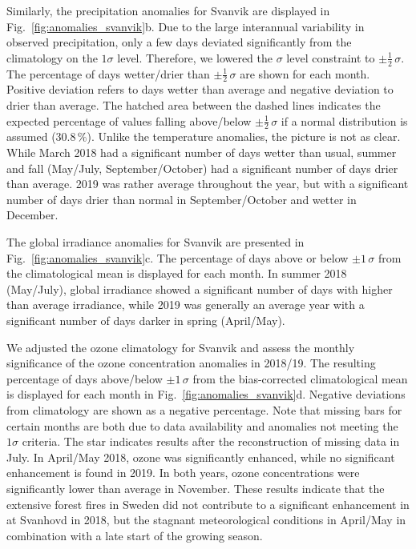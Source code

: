 \documentclass[bg, manuscript]{copernicus}
\begin{document}
Similarly, the precipitation anomalies for Svanvik are displayed in Fig.~\ref{fig:anomalies_svanvik}b. Due to the large interannual variability in observed precipitation, only a few days deviated significantly from the climatology on the $1 \sigma$ level. Therefore, we lowered the $\sigma$ level constraint to $\pm \frac{1}{2}\,\sigma$. The percentage of days wetter/drier than $\pm \frac{1}{2}\,\sigma$ are shown for each month. Positive deviation refers to days wetter than average and negative deviation to drier than average. The hatched area between the dashed lines indicates the expected percentage of values falling above/below $\pm\frac{1}{2}\,\sigma$ if a normal distribution is assumed ($30.8\,\unit{\%}$). Unlike the temperature anomalies, the picture is not as clear. While March 2018 had a significant number of days wetter than usual, summer and fall (May/July, September/October) had a significant number of days drier than average. 2019 was rather average throughout the year, but with a significant number of days drier than normal in September/October and wetter in December.

The global irradiance anomalies for Svanvik are presented in Fig.~\ref{fig:anomalies_svanvik}c. The percentage of days above or below $\pm 1\,\sigma$ from the climatological mean is displayed for each month. In summer 2018 (May/July), global irradiance showed a significant number of days with higher than average irradiance, while 2019 was generally an average year with a significant number of days darker in spring (April/May).

We adjusted the ozone climatology for Svanvik \citep{ACPD:Falk2021} and assess the monthly significance of the ozone concentration anomalies in 2018/19. The resulting percentage of days above/below $\pm 1\,\sigma$ from the bias-corrected climatological mean is displayed for each month in Fig.~\ref{fig:anomalies_svanvik}d. Negative deviations from climatology are shown as a negative percentage. Note that missing bars for certain months are both due to data availability and anomalies not meeting the $1\sigma$ criteria. The star indicates results after the reconstruction of missing data in July. In April/May 2018, ozone was significantly enhanced, while no significant enhancement is found in 2019. In both years, ozone concentrations were significantly lower than average in November. These results indicate that the extensive forest fires in Sweden did not contribute to a significant enhancement in \chem{[O_3]} at Svanhovd in 2018, but the stagnant meteorological conditions in April/May in combination with a late start of the growing season.
\end{document}
